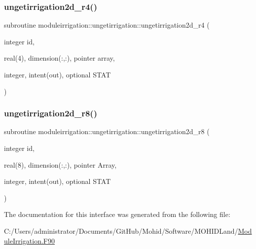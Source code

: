 \subsubsection{\texorpdfstring{ungetirrigation2d\+\_\+r4()}{ungetirrigation2d\_r4()}}
{\footnotesize\ttfamily subroutine moduleirrigation\+::ungetirrigation\+::ungetirrigation2d\+\_\+r4 (\begin{DoxyParamCaption}\item[{integer}]{id,  }\item[{real(4), dimension(\+:,\+:), pointer}]{array,  }\item[{integer, intent(out), optional}]{S\+T\+AT }\end{DoxyParamCaption})\hspace{0.3cm}{\ttfamily [private]}}

\mbox{\label{interfacemoduleirrigation_1_1ungetirrigation_a19e38a67e8ac04735c0eb684e7d63dcf}} 
\subsubsection{\texorpdfstring{ungetirrigation2d\+\_\+r8()}{ungetirrigation2d\_r8()}}
{\footnotesize\ttfamily subroutine moduleirrigation\+::ungetirrigation\+::ungetirrigation2d\+\_\+r8 (\begin{DoxyParamCaption}\item[{integer}]{id,  }\item[{real(8), dimension(\+:,\+:), pointer}]{Array,  }\item[{integer, intent(out), optional}]{S\+T\+AT }\end{DoxyParamCaption})\hspace{0.3cm}{\ttfamily [private]}}



The documentation for this interface was generated from the following file\+:\begin{DoxyCompactItemize}
\item 
C\+:/\+Users/administrator/\+Documents/\+Git\+Hub/\+Mohid/\+Software/\+M\+O\+H\+I\+D\+Land/\mbox{\hyperlink{_module_irrigation_8_f90}{Module\+Irrigation.\+F90}}\end{DoxyCompactItemize}
